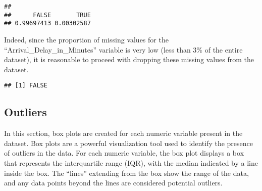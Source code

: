 \documentclass[
]{article}
\newenvironment{Shaded}{\begin{snugshade}}{\end{snugshade}}
\newcommand{\CommentTok}[1]{\textcolor[rgb]{0.56,0.35,0.01}{\textit{#1}}}
\newcommand{\FunctionTok}[1]{\textcolor[rgb]{0.13,0.29,0.53}{\textbf{#1}}}
\newcommand{\NormalTok}[1]{#1}
\newcommand{\OtherTok}[1]{\textcolor[rgb]{0.56,0.35,0.01}{#1}}
\newcommand{\SpecialCharTok}[1]{\textcolor[rgb]{0.81,0.36,0.00}{\textbf{#1}}}
\begin{document}
\begin{Shaded}
\end{Shaded}

\begin{verbatim}
## 
##      FALSE       TRUE 
## 0.99697413 0.00302587
\end{verbatim}

Indeed, since the proportion of missing values for the
``Arrival\_Delay\_in\_Minutes'' variable is very low (less than 3\% of
the entire dataset), it is reasonable to proceed with dropping these
missing values from the dataset.

\begin{Shaded}
\end{Shaded}

\begin{verbatim}
## [1] FALSE
\end{verbatim}

\hypertarget{outliers}{%
\subsection{Outliers}\label{outliers}}

In this section, box plots are created for each numeric variable present
in the dataset. Box plots are a powerful visualization tool used to
identify the presence of outliers in the data. For each numeric
variable, the box plot displays a box that represents the interquartile
range (IQR), with the median indicated by a line inside the box. The
``lines'' extending from the box show the range of the data, and any
data points beyond the lines are considered potential outliers.
\end{document}
